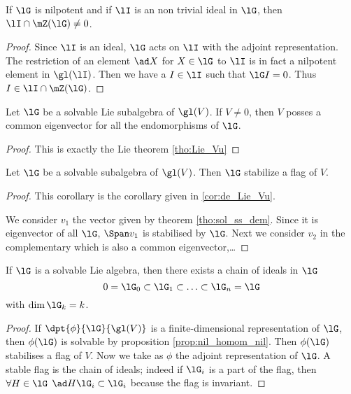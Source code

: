 \begin{lemma}
If $\lG$ is nilpotent and if $\lI$ is an non trivial ideal in $\lG$, then $\lI\cap\mZ(\lG)\neq 0$.
\end{lemma}

\begin{proof}
Since $\lI$ is an ideal, $\lG$ acts on $\lI$ with the adjoint representation. The restriction of an element $\ad X$ for $X\in\lG$ to $\lI$ is in fact a nilpotent element in $\gl(\lI)$. Then we have a $I\in\lI$ such that $\lG I=0$. Thus $I\in\lI\cap\mZ(\lG)$.
\end{proof}

\begin{theorem}
Let $\lG$ be a solvable Lie subalgebra of $\gl(V)$. If $V\neq 0$, then $V$ posses a common eigenvector for all the endomorphisms of $\lG$.
\label{tho:sol_ss_dem}
\end{theorem}

\begin{proof}
This is exactly the Lie theorem \ref{tho:Lie_Vu}
\end{proof}

\begin{corollary}
Let $\lG$ be a solvable subalgebra of $\gl(V)$. Then $\lG$ stabilize a flag of $V$.
\label{tho:Lie_Vd}
\end{corollary}

\begin{proof}

This corollary is the corollary given in \ref{cor:de_Lie_Vu}.

We consider $v_1$ the vector given by theorem \ref{tho:sol_ss_dem}. Since it is eigenvector of all $\lG$, $\Span v_1$ is stabilised by $\lG$. Next we consider $v_2$ in the complementary which is also a common eigenvector,\ldots
\end{proof}

\begin{corollary}
If $\lG$ is a solvable Lie algebra, then there exists a chain of ideals in $\lG$
\[
  0=\lG_0\subset\lG_1\subset\ldots\subset\lG_n=\lG
\]
with $\dim\lG_k=k$.
\end{corollary}

\begin{proof}
If $\dpt{\phi}{\lG}{\gl(V)}$ is a finite-dimensional representation of $\lG$, then $\phi(\lG)$ is solvable by proposition \ref{prop:nil_homom_nil}. Then $\phi(\lG)$ stabilises a flag of $V$. Now we take as $\phi$ the adjoint representation of $\lG$. A stable flag is the chain of ideals; indeed if $\lG_i$ is a part of the flag, then $\forall H\in\lG$ $\ad H\lG_i\subset\lG_i$ because the flag is invariant.
\end{proof}


